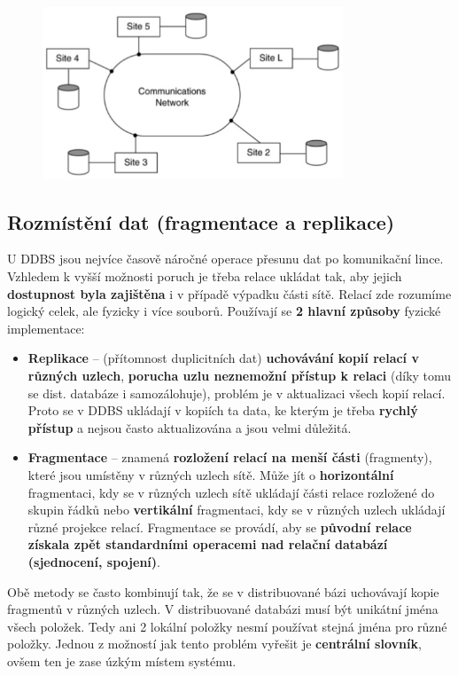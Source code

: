 \begin{figure}[H]
\centering
\includegraphics[width=0.8\textwidth]{assets/ddbs2.png}
\end{figure}

\subsection{Rozmístění dat (fragmentace a replikace)}
U DDBS jsou nejvíce časově náročné operace přesunu dat po komunikační lince. Vzhledem k vyšší možnosti poruch je třeba relace ukládat tak, aby jejich \textbf{dostupnost byla zajištěna} i v případě výpadku části sítě. Relací zde rozumíme logický celek, ale fyzicky i více souborů. Používají se \textbf{2 hlavní způsoby} fyzické implementace:
\begin{itemize}
	\item \textbf{Replikace} -- (přítomnost duplicitních dat) \textbf{uchovávání kopií relací v různých uzlech}, \textbf{porucha uzlu neznemožní přístup k relaci} (díky tomu se dist. databáze i samozálohuje), problém je v aktualizaci všech kopií relací. Proto se v DDBS ukládají v kopiích ta data, ke kterým je třeba \textbf{rychlý přístup} a nejsou často aktualizována a jsou velmi důležitá. 
	\item \textbf{Fragmentace} --  znamená \textbf{rozložení relací na menší části} (fragmenty), které jsou umístěny v různých
	uzlech sítě. Může jít o \textbf{horizontální} fragmentaci, kdy se v různých uzlech sítě ukládají části relace rozložené do skupin řádků nebo \textbf{vertikální} fragmentaci, kdy se v různých uzlech ukládají různé	projekce relací. Fragmentace se provádí, aby se \textbf{původní relace získala zpět standardními operacemi nad relační databází (sjednocení, spojení)}. 
\end{itemize}
Obě metody se často kombinují tak, že se v distribuované bázi uchovávají kopie fragmentů v různých uzlech.
V distribuované databázi musí být unikátní jména všech položek. Tedy ani 2 lokální položky nesmí používat
stejná jména pro různé položky. Jednou z možností jak tento problém vyřešit je \textbf{centrální slovník}, ovšem ten
je zase úzkým místem systému. 